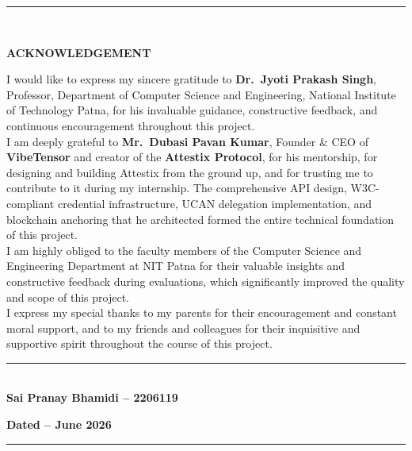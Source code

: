 \pagebreak
{}
\cleardoublepage


\vspace*{-\topskip}
\rule{\linewidth}{2pt} \\
\vspace{0.1in}
\begin{center}
{\bf \Large ACKNOWLEDGEMENT }\\
\par\vspace{5mm}
\end{center}
{\normalsize
\noindent I would like to express my sincere gratitude to \textbf{Dr.\ Jyoti Prakash Singh}, Professor, Department of Computer Science and Engineering, National Institute of Technology Patna, for his invaluable guidance, constructive feedback, and continuous encouragement throughout this project.\\[0.1in]

\noindent I am deeply grateful to \textbf{Mr.\ Dubasi Pavan Kumar}, Founder \& CEO of \textbf{VibeTensor} and creator of the \textbf{Attestix Protocol}, for his mentorship, for designing and building Attestix from the ground up, and for trusting me to contribute to it during my internship. The comprehensive API design, W3C-compliant credential infrastructure, UCAN delegation implementation, and blockchain anchoring that he architected formed the entire technical foundation of this project.\\[0.1in]

\noindent I am highly obliged to the faculty members of the Computer Science and Engineering Department at NIT Patna for their valuable insights and constructive feedback during evaluations, which significantly improved the quality and scope of this project.\\[0.1in]

\noindent I express my special thanks to my parents for their encouragement and constant moral support, and to my friends and colleagues for their inquisitive and supportive spirit throughout the course of this project.\\[0.1in]
}

\begin{flushleft}
\vspace{8mm}
\rule{6cm}{0.15mm} \\
\textbf{Sai Pranay Bhamidi -- 2206119}
\vspace{20mm}

\textbf{Dated -- June 2026}

\end{flushleft}

\vfill
\rule{\linewidth}{2pt}
